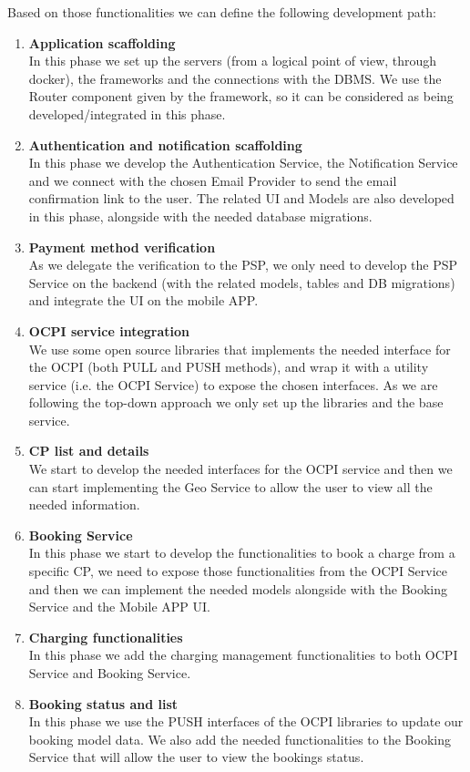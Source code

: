 Based on those functionalities we can define the following development path:
\begin{enumerate}
	\item \textbf{Application scaffolding}\\
	In this phase we set up the servers (from a logical point of view, through docker), the frameworks and the connections with the DBMS. We use the Router component given by the framework, so it can be considered as being developed/integrated in this phase.
	\item \textbf{Authentication and notification scaffolding}\\ In this phase we develop the Authentication Service, the Notification Service and we connect with the chosen Email Provider to send the email confirmation link to the user. The related UI and Models are also developed in this phase, alongside with the needed database migrations.
	\item \textbf{Payment method verification}\\ As we delegate the verification to the PSP, we only need to develop the PSP Service on the backend (with the related models, tables and DB migrations) and integrate the UI on the mobile APP.
	\item \textbf{OCPI service integration}\\ We use some open source libraries that implements the needed interface for the OCPI (both PULL and PUSH methods), and wrap it with a utility service (i.e. the OCPI Service) to expose the chosen interfaces. As we are following the top-down approach we only set up the libraries and the base service.
	\item \textbf{CP list and details}\\ We start to develop the needed interfaces for the OCPI service and then we can start implementing the Geo Service to allow the user to view all the needed information.
	\item \textbf{Booking Service}\\ In this phase we start to develop the functionalities to book a charge from a specific CP, we need to expose those functionalities from the OCPI Service and then we can implement the needed models alongside with the Booking Service and the Mobile APP UI.
	\item \textbf{Charging functionalities}\\ In this phase we add the charging management functionalities to both OCPI Service and Booking Service.
	\item \textbf{Booking status and list}\\ In this phase we use the PUSH interfaces of the OCPI libraries to update our booking model data. We also add the needed functionalities to the Booking Service that will allow the user to view the bookings status.

\end{enumerate}

